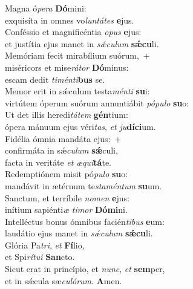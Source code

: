 \evenverse Magna ó\textit{pe}\textit{ra} \textbf{Dó}mini:~\*\\
\evenverse exquisíta in omnes vo\textit{lun}\textit{tá}\textit{tes} \textbf{e}jus.\\
\oddverse Conféssio et magnificéntia \textit{o}\textit{pus} \textbf{e}jus:~\*\\
\oddverse et justítia ejus manet in \textit{sǽ}\textit{cu}\textit{lum} \textbf{sǽ}\textbf{cu}li.\\
\evenverse Memóriam fecit mirabílium suórum,~+\\
\evenverse  miséricors et mise\textit{rá}\textit{tor} \textbf{Dó}minus:~\*\\
\evenverse escam dedit \textit{ti}\textit{mén}\textit{ti}\textbf{bus} se.\\
\oddverse Memor erit in sǽculum testa\textit{mén}\textit{ti} \textbf{su}i:~\*\\
\oddverse virtútem óperum suórum annuntiábit \textit{pó}\textit{pu}\textit{lo} \textbf{su}o:\\
\evenverse Ut det illis heredi\textit{tá}\textit{tem} \textbf{gén}tium:~\*\\
\evenverse ópera mánuum ejus véri\textit{tas}, \textit{et} \textit{ju}\textbf{dí}\textbf{ci}um.\\
\oddverse Fidélia ómnia mandáta ejus:~+\\
\oddverse  confirmáta in sǽ\textit{cu}\textit{lum} \textbf{sǽ}culi,~\*\\
\oddverse facta in veritáte \textit{et} \textit{æ}\textit{qui}\textbf{tá}te.\\
\evenverse Redemptiónem misit pó\textit{pu}\textit{lo} \textbf{su}o:~\*\\
\evenverse mandávit in ætérnum te\textit{sta}\textit{mén}\textit{tum} \textbf{su}um.\\
\oddverse Sanctum, et terríbile \textit{no}\textit{men} \textbf{e}jus:~\*\\
\oddverse inítium sapiénti\textit{æ} \textit{ti}\textit{mor} \textbf{Dó}\textbf{mi}ni.\\
\evenverse Intelléctus bonus ómnibus facién\textit{ti}\textit{bus} \textbf{e}um:~\*\\
\evenverse laudátio ejus manet in \textit{sǽ}\textit{cu}\textit{lum} \textbf{sǽ}\textbf{cu}li.\\
\oddverse Glória Pa\textit{tri}, \textit{et} \textbf{Fí}lio,~\*\\
\oddverse et Spi\textit{rí}\textit{tu}\textit{i} \textbf{San}cto.\\
\evenverse Sicut erat in princípio, et \textit{nunc}, \textit{et} \textbf{sem}per,~\*\\
\evenverse et in sǽcula sæ\textit{cu}\textit{ló}\textit{rum}. \textbf{A}men.\\
